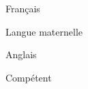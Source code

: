 

\begin{cventries}

\cventrytitleanddescription
    {Français}
    {
    Langue maternelle
    
    }
    
    
\cventrytitleanddescription
    {Anglais}
    {
    Compétent
    
    }
    
\end{cventries}